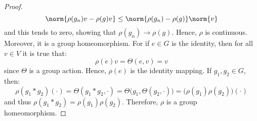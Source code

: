 \documentclass{article}                                                        %
\begin{document}
\begin{proof}
                \begin{equation}
                    \norm{\rho(g_{n})v-\rho(g)v}
                    \leq\norm{\rho(g_{n})-\rho(g)}\norm{v}
                \end{equation}
                and this tends to zero, showing that
                $\rho(g_{n})\rightarrow\rho(g)$. Hence, $\rho$ is continuous.
                Moreover, it is a group homeomorphism. For if $e\in{G}$ is the
                identity, then for all $v\in{V}$ it is true that:
                \begin{equation}
                    \rho(e)v=\Theta(e,v)=v
                \end{equation}
                since $\Theta$ is a group action. Hence, $\rho(e)$ is the identity
                mapping. If $g_{1},g_{2}\in{G}$, then:
                \begin{equation}
                    \rho(g_{1}*g_{2})(\cdot)=\Theta(g_{1}*g_{2},\cdot)
                        =\Theta\big(g_{1},\Theta(g_{2},\cdot)\big)
                        =\big(\rho(g_{1})\rho(g_{2})\big)(\cdot)
                \end{equation}
                and thus $\rho(g_{1}*g_{2})=\rho(g_{1})\rho(g_{2})$. Therefore,
                $\rho$ is a group homeomorphism.
            \end{proof}
\end{document}

